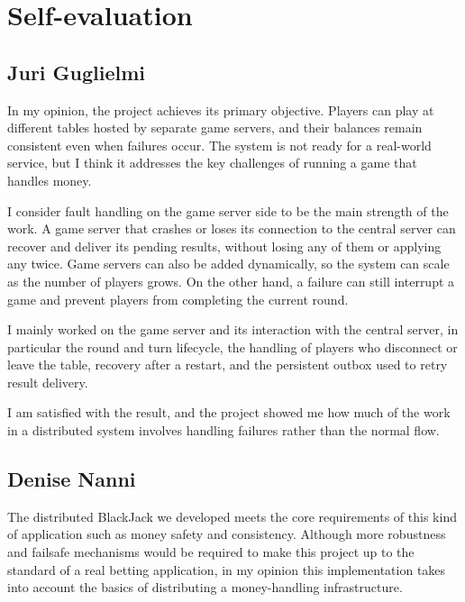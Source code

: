 \documentclass{scrartcl}
\begin{document}

\section{Self-evaluation}\label{self-evaluation}

\subsection*{Juri Guglielmi}
In my opinion, the project achieves its primary objective. Players can play at different tables hosted by separate game servers, and their balances remain consistent even when failures occur. The system is not ready for a real-world service, but I think it addresses the key challenges of running a game that handles money.

I consider fault handling on the game server side to be the main strength of the work. A game server that crashes or loses its connection to the central server can recover and deliver its pending results, without losing any of them or applying any twice.
Game servers can also be added dynamically, so the system can scale as the number of players grows.
On the other hand, a failure can still interrupt a game and prevent players from completing the current round.

I mainly worked on the game server and its interaction with the central server, in particular the round and turn lifecycle, the handling of players who disconnect or leave the table, recovery after a restart, and the persistent outbox used to retry result delivery.

I am satisfied with the result, and the project showed me how much of the work in a distributed system involves handling failures rather than the normal flow.

\subsection*{Denise Nanni}
The distributed BlackJack we developed meets the core requirements of this kind of application such as money safety and consistency.
Although more robustness and failsafe mechanisms would be required to make this project up to the standard of a real betting application, in my opinion this implementation takes into account the basics of distributing a money-handling infrastructure.
\end{document}
